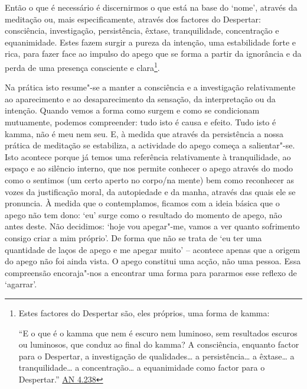 Então o que é necessário é discernirmos o que está na base do `nome', através da meditação ou, mais especificamente, através dos factores do Despertar: consciência, investigação, persistência, êxtase, tranquilidade, concentração e equanimidade. Estes fazem surgir a pureza da intenção, uma estabilidade forte e rica, para fazer face ao impulso do apego que se forma a partir da ignorância e da perda de uma presença consciente e clara\footnote{Estes factores do Despertar são, eles próprios, uma forma de kamma:

  ``E o que é o kamma que nem é escuro nem luminoso, sem resultados escuros ou luminosos, que conduz ao final do kamma? A consciência, enquanto factor para o Despertar, a investigação de qualidades\ldots{} a persistência\ldots{} a êxtase\ldots{} a tranquilidade\ldots{} a concentração\ldots{} a equanimidade como factor para o Despertar.'' \href{https://suttacentral.net/an4.238/en/sujato}{AN 4.238}}.

Na prática isto resume"-se a manter a consciência e a investigação relativamente ao aparecimento e ao desaparecimento da sensação, da interpretação ou da intenção. Quando vemos a forma como surgem e como se condicionam mutuamente, podemos compreender: tudo isto é causa e efeito. Tudo isto é kamma, não é meu nem seu. E, à medida que através da persistência a nossa prática de meditação se estabiliza, a actividade do apego começa a salientar"-se. Isto acontece porque já temos uma referência relativamente à tranquilidade, ao espaço e ao silêncio interno, que nos permite conhecer o apego através do modo como o sentimos (um certo aperto no corpo/na mente) bem como reconhecer as vozes da justificação moral, da autopiedade e da manha, através das quais ele se pronuncia. À medida que o contemplamos, ficamos com a ideia básica que o apego não tem dono: `eu' surge como o resultado do momento de apego, não antes deste. Não decidimos: `hoje vou apegar"-me, vamos a ver quanto sofrimento consigo criar a mim próprio'. De forma que não se trata de `eu ter uma quantidade de laços de apego e me apegar muito' -- acontece apenas que a origem do apego não foi ainda vista. O apego constitui uma acção, não uma pessoa. Essa compreensão encoraja"-nos a encontrar uma forma para pararmos esse reflexo de `agarrar'.

